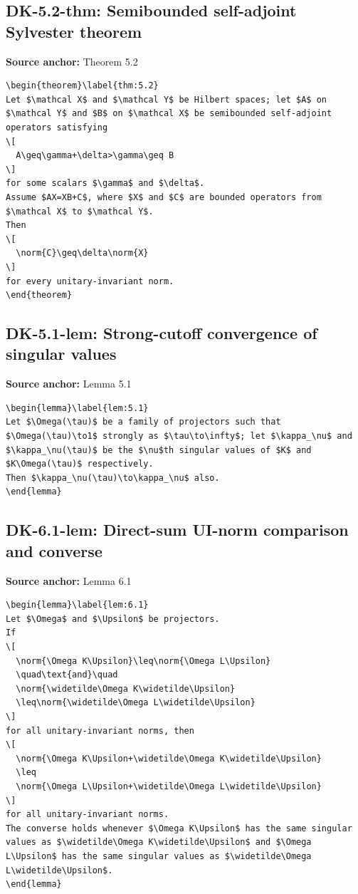 \subsection*{DK-5.2-thm: Semibounded self-adjoint Sylvester theorem}
\noindent\textbf{Source anchor:} Theorem 5.2\\
\begin{verbatim}
\begin{theorem}\label{thm:5.2}
Let $\mathcal X$ and $\mathcal Y$ be Hilbert spaces; let $A$ on $\mathcal Y$ and $B$ on $\mathcal X$ be semibounded self-adjoint operators satisfying
\[
  A\geq\gamma+\delta>\gamma\geq B
\]
for some scalars $\gamma$ and $\delta$.
Assume $AX=XB+C$, where $X$ and $C$ are bounded operators from $\mathcal X$ to $\mathcal Y$.
Then
\[
  \norm{C}\geq\delta\norm{X}
\]
for every unitary-invariant norm.
\end{theorem}
\end{verbatim}

\subsection*{DK-5.1-lem: Strong-cutoff convergence of singular values}
\noindent\textbf{Source anchor:} Lemma 5.1\\
\begin{verbatim}
\begin{lemma}\label{lem:5.1}
Let $\Omega(\tau)$ be a family of projectors such that $\Omega(\tau)\to1$ strongly as $\tau\to\infty$; let $\kappa_\nu$ and $\kappa_\nu(\tau)$ be the $\nu$th singular values of $K$ and $K\Omega(\tau)$ respectively.
Then $\kappa_\nu(\tau)\to\kappa_\nu$ also.
\end{lemma}
\end{verbatim}

\subsection*{DK-6.1-lem: Direct-sum UI-norm comparison and converse}
\noindent\textbf{Source anchor:} Lemma 6.1\\
\begin{verbatim}
\begin{lemma}\label{lem:6.1}
Let $\Omega$ and $\Upsilon$ be projectors.
If
\[
  \norm{\Omega K\Upsilon}\leq\norm{\Omega L\Upsilon}
  \quad\text{and}\quad
  \norm{\widetilde\Omega K\widetilde\Upsilon}
  \leq\norm{\widetilde\Omega L\widetilde\Upsilon}
\]
for all unitary-invariant norms, then
\[
  \norm{\Omega K\Upsilon+\widetilde\Omega K\widetilde\Upsilon}
  \leq
  \norm{\Omega L\Upsilon+\widetilde\Omega L\widetilde\Upsilon}
\]
for all unitary-invariant norms.
The converse holds whenever $\Omega K\Upsilon$ has the same singular values as $\widetilde\Omega K\widetilde\Upsilon$ and $\Omega L\Upsilon$ has the same singular values as $\widetilde\Omega L\widetilde\Upsilon$.
\end{lemma}
\end{verbatim}


